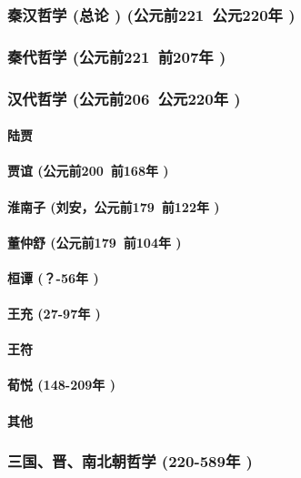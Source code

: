 \documentclass[UTF8]{../RepresentationUniverse}
\begin{document}
    \subsubsection{秦汉哲学 (总论 ) (公元前221~公元220年 )}
    \subsubsection{秦代哲学 (公元前221~前207年 )}
    \subsubsection{汉代哲学 (公元前206~公元220年 )}

        \paragraph{陆贾}
        \paragraph{贾谊 (公元前200~前168年 )}
        \paragraph{淮南子 (刘安，公元前179~前122年 )}
        \paragraph{董仲舒 (公元前179~前104年 )}
        \paragraph{桓谭 (？-56年 )}
        \paragraph{王充 (27-97年 )}
        \paragraph{王符}
        \paragraph{荀悦 (148-209年 )}
        \paragraph{其他}

    \subsubsection{三国、晋、南北朝哲学 (220-589年 )}
\end{document}
